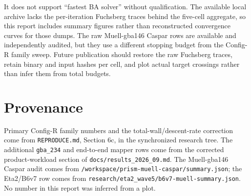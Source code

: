 \documentclass[10pt]{article}
\begin{document}
It does not support ``fastest BA solver'' without qualification.  The available local archive lacks the per-iteration Fuchsberg traces behind the five-cell aggregate, so this report includes summary figures rather than reconstructed convergence curves for those dumps.  The raw Muell-gba146 Caspar rows are available and independently audited, but they use a different stopping budget from the Config-R family sweep.  Future publication should restore the raw Fuchsberg traces, retain binary and input hashes per cell, and plot actual target crossings rather than infer them from total budgets.

\section*{Provenance}

Primary Config-R family numbers and the total-wall/descent-rate correction come from \texttt{REPRODUCE.md}, Section 6c, in the synchronized research tree.  The additional \texttt{gba\_234} and end-to-end mapper rows come from the corrected product-workload section of \texttt{docs/results\_2026\_09.md}.  The Muell-gba146 Caspar audit comes from \nolinkurl{/workspace/prism-muell-caspar/summary.json}; the Eta2/B6v7 row comes from \nolinkurl{research/eta2_wave5/b6v7-muell-summary.json}.  No number in this report was inferred from a plot.
\end{document}
